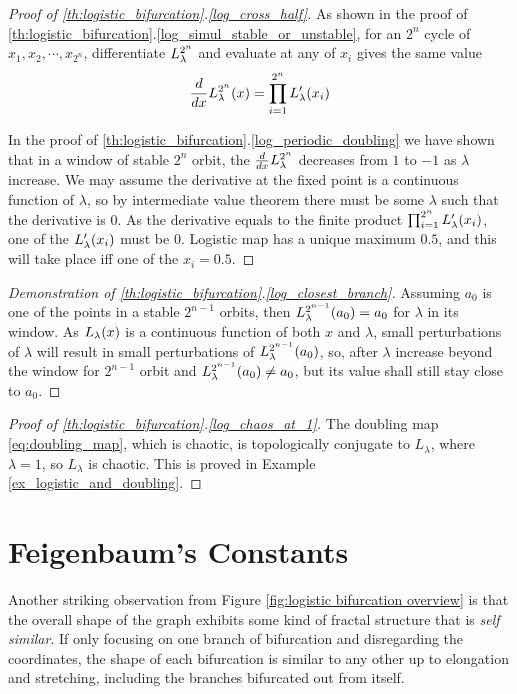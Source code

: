 \begin{proof}[Proof of \ref{th:logistic_bifurcation}.\ref{log_cross_half}]
	As shown in the proof of \ref{th:logistic_bifurcation}.\ref{log_simul_stable_or_unstable}, for an $2^n$ cycle of $x_1, x_2, \cdots, x_{2^n}$, differentiate $L_{\lambda}^{2^n}$ and evaluate at any of $x_i$ gives the same value
	$$
	\frac{d}{dx} L_{\lambda}^{2^n}(x) = \prod_{i=1}^{2^n} L_{\lambda}'(x_i)
	$$
	
	In the proof of \ref{th:logistic_bifurcation}.\ref{log_periodic_doubling} we have shown that in a window of stable $2^n$ orbit, the $\frac{d}{dx} L_{\lambda}^{2^n}$ decreases from $1$ to $-1$ as $\lambda$ increase.
	We may assume the derivative at the fixed point is a continuous function of $\lambda$, so by intermediate value theorem there must be some $\lambda$ such that the derivative is $0$. 
	As the derivative equals to the finite product $\prod_{i=1}^{2^n} L_{\lambda}'(x_i)$, one of the $L_{\lambda}'(x_i)$ must be $0$.
	Logistic map has a unique maximum $0.5$, and this will take place iff one of the $x_i = 0.5$.
\end{proof}

\begin{proof}[Demonstration of \ref{th:logistic_bifurcation}.\ref{log_closest_branch}]
	Assuming $a_0$ is one of the points in a stable $2^{n-1}$ orbits, then $L_{\lambda}^{2^{n-1}}(a_0)=a_0$ for $\lambda$ in its window.
	As $L_{\lambda}(x)$ is a continuous function of both $x$ and $\lambda$, small perturbations of $\lambda$ will result in small perturbations of $L_{\lambda}^{2^{n-1}}(a_0)$, so, after $\lambda$ increase beyond the window for $2^{n-1}$ orbit and $L_{\lambda}^{2^{n-1}}(a_0) \neq a_0$, but its value shall still stay close to $a_0$.
\end{proof}


\begin{proof}[Proof of \ref{th:logistic_bifurcation}.\ref{log_chaos_at_1}]
	The doubling map \eqref{eq:doubling_map}, which is chaotic, is topologically conjugate to $L_{\lambda}$, where $\lambda = 1$, so $L_{\lambda}$ is chaotic.
	This is proved in Example \ref{ex_logistic_and_doubling}.
\end{proof}

\section{Feigenbaum's Constants}

Another striking observation from Figure \ref{fig:logistic bifurcation overview} is that the overall shape of the graph exhibits some kind of fractal structure that is \emph{self similar}.
If only focusing on one branch of bifurcation and disregarding the coordinates, the shape of each bifurcation is similar to any other up to elongation and stretching, including the branches bifurcated out from itself.
 
